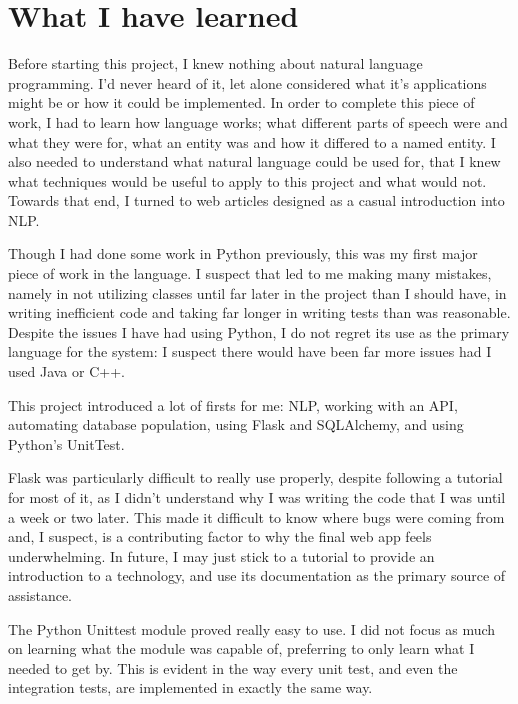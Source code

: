 \documentclass[11pt,a4paper]{book}
\begin{document}
\section{What I have learned}
Before starting this project, I knew nothing about natural language programming. I'd never heard of it, let alone considered what it's applications might be or how it could be implemented. In order to complete this piece of work, I had to learn how language works; what different parts of speech were and what they were for, what an entity was and how it differed to a named entity. I also needed to understand what natural language could be used for, that I knew what techniques would be useful to apply to this project and what would not. Towards that end, I turned to web articles designed as a casual introduction into NLP.

Though I had done some work in Python previously, this was my first major piece of work in the language. I suspect that led to me making many mistakes, namely in not utilizing classes until far later in the project than I should have, in writing inefficient code and taking far longer in writing tests than was reasonable. Despite the issues I have had using Python, I do not regret its use as the primary language for the system: I suspect there would have been far more issues had I used Java or C++. 

This project introduced a lot of firsts for me: NLP, working with an API, automating database population, using Flask and SQLAlchemy, and using Python's UnitTest. 

Flask was particularly difficult to really use properly, despite following a tutorial for most of it, as I didn't understand why I was writing the code that I was until a week or two later. This made it difficult to know where bugs were coming from and, I suspect, is a contributing factor to why the final web app feels underwhelming. In future, I may just stick to a tutorial to provide an introduction to a technology, and use its documentation as the primary source of assistance.

The Python Unittest module proved really easy to use. I did not focus as much on learning what the module was capable of, preferring to only learn what I needed to get by. This is evident in the way every unit test, and even the integration tests, are implemented in exactly the same way. 
\end{document}
